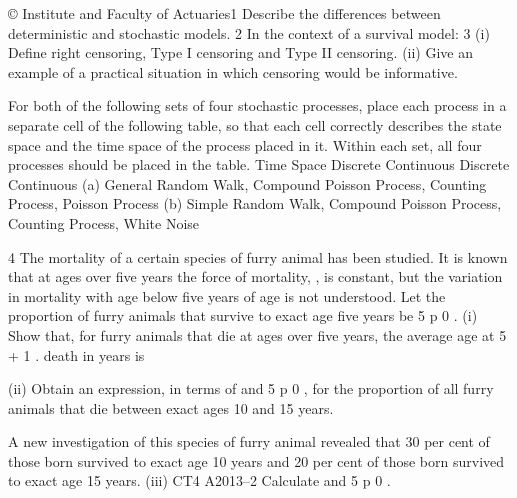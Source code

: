 © Institute and Faculty of Actuaries1 Describe the differences between deterministic and stochastic models.
2 In the context of a survival model:
3
(i) Define right censoring, Type I censoring and Type II censoring.
(ii) Give an example of a practical situation in which censoring would be
informative.



For both of the following sets of four stochastic processes, place each process in a
separate cell of the following table, so that each cell correctly describes the state space
and the time space of the process placed in it. Within each set, all four processes
should be placed in the table.
Time Space
Discrete
Continuous
Discrete
Continuous
(a) General Random Walk, Compound Poisson Process, Counting Process,
Poisson Process
(b) Simple Random Walk, Compound Poisson Process, Counting Process,
White Noise

4
The mortality of a certain species of furry animal has been studied. It is known that at
ages over five years the force of mortality, \mu, is constant, but the variation in mortality
with age below five years of age is not understood. Let the proportion of furry
animals that survive to exact age five years be 5 p 0 .
(i) Show that, for furry animals that die at ages over five years, the average age at
5 \mu + 1
.
death in years is

\mu
(ii) Obtain an expression, in terms of \mu and 5 p 0 , for the proportion of all furry
animals that die between exact ages 10 and 15 years.

A new investigation of this species of furry animal revealed that 30 per cent of those
born survived to exact age 10 years and 20 per cent of those born survived to exact
age 15 years.
(iii)
CT4 A2013–2
Calculate \mu and
5
p 0 .

